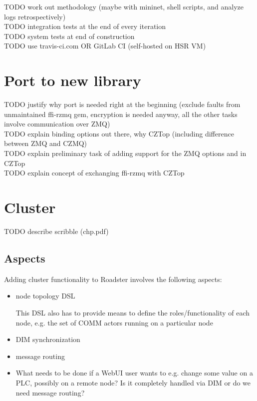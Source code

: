 TODO work out methodology (maybe with mininet, shell scripts, and analyze logs retrospectively)\\
TODO integration tests at the end of every iteration\\
TODO system tests at end of construction\\
TODO use travis-ci.com OR GitLab CI (self-hosted on HSR VM)\\

\section{Port to new \zmq library}\label{sec:meth:port}
TODO justify why port is needed right at the beginning (exclude faults from unmaintained ffi-rzmq gem, encryption is needed anyway, all the other tasks involve communication over ZMQ)\\
TODO explain binding options out there, why CZTop (including difference between ZMQ and CZMQ)\\
TODO explain preliminary task of adding support for the ZMQ options  and  in CZTop\\
TODO explain concept of exchanging ffi-rzmq with CZTop\\


\section{Cluster}\label{sec:meth:cluster}
TODO describe scribble (chp.pdf)


\subsection{Aspects}
Adding cluster functionality to Roadster involves the following aspects:
\begin{itemize}
	\item node topology DSL

		This DSL also has to provide means to define the roles/functionality of each node, e.g. the set of COMM actors running on a particular node

	\item DIM synchronization
	\item message routing
	\item What needs to be done if a WebUI user wants to e.g. change some value on a PLC, possibly on a remote node? Is it completely handled via DIM or do we need message routing?
\end{itemize}

